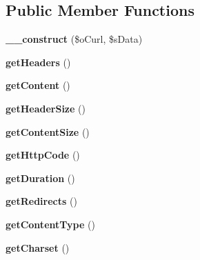 \subsection*{Public Member Functions}
\begin{DoxyCompactItemize}
\item 
\hypertarget{class_web_response_a50aaa44e23d18e06b6445831260ddc31}{{\bfseries \-\_\-\-\_\-construct} (\$o\-Curl, \$s\-Data)}\label{class_web_response_a50aaa44e23d18e06b6445831260ddc31}

\item 
\hypertarget{class_web_response_acdd5f249407f7e038721177ffbef2f81}{{\bfseries get\-Headers} ()}\label{class_web_response_acdd5f249407f7e038721177ffbef2f81}

\item 
\hypertarget{class_web_response_a99df2c4e273bf477e015930ad533cc98}{{\bfseries get\-Content} ()}\label{class_web_response_a99df2c4e273bf477e015930ad533cc98}

\item 
\hypertarget{class_web_response_aae5b7dbc78d3faf7b93e3ab995f28291}{{\bfseries get\-Header\-Size} ()}\label{class_web_response_aae5b7dbc78d3faf7b93e3ab995f28291}

\item 
\hypertarget{class_web_response_a3b82f59de7adff76fcee8e96f1a8c2ee}{{\bfseries get\-Content\-Size} ()}\label{class_web_response_a3b82f59de7adff76fcee8e96f1a8c2ee}

\item 
\hypertarget{class_web_response_ac305b0d62942ebbc9377d1b6dddfd451}{{\bfseries get\-Http\-Code} ()}\label{class_web_response_ac305b0d62942ebbc9377d1b6dddfd451}

\item 
\hypertarget{class_web_response_a7bee0128f3526eda2c60b9cf019f992d}{{\bfseries get\-Duration} ()}\label{class_web_response_a7bee0128f3526eda2c60b9cf019f992d}

\item 
\hypertarget{class_web_response_a49ebff3dc10f6c0211b600309d4d6f84}{{\bfseries get\-Redirects} ()}\label{class_web_response_a49ebff3dc10f6c0211b600309d4d6f84}

\item 
\hypertarget{class_web_response_a4a4a0a014f85a42f67dd9d0bec3c60f6}{{\bfseries get\-Content\-Type} ()}\label{class_web_response_a4a4a0a014f85a42f67dd9d0bec3c60f6}

\item 
\hypertarget{class_web_response_a9c1166149ff01edd2a82c436c3a1c051}{{\bfseries get\-Charset} ()}\label{class_web_response_a9c1166149ff01edd2a82c436c3a1c051}


\end{DoxyCompactItemize}
